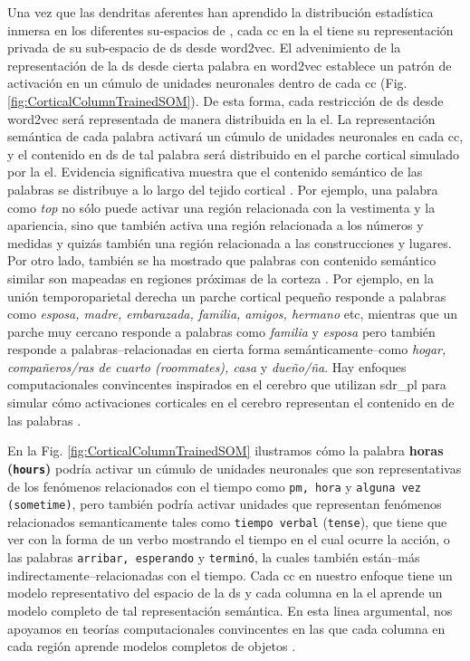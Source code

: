 {Una vez que las dendritas aferentes han aprendido la distribución estadística inmersa en los diferentes su-espacios de , cada \gls{cc} en la \gls{el} tiene su representación privada de su sub-espacio de \gls{ds} desde word2vec.
El advenimiento de la representación de la \gls{ds} desde cierta palabra en word2vec establece un patrón de activación en un cúmulo de unidades neuronales dentro de cada \gls{cc} (Fig. \ref{fig:CorticalColumnTrainedSOM}).
De esta forma, cada restricción de \gls{ds} desde word2vec será representada de manera distribuida en la \gls{el}.
La representación semántica de cada palabra activará un cúmulo de unidades neuronales en cada \gls{cc}, y el contenido en \gls{ds} de tal palabra será distribuido en el parche cortical simulado por la \gls{el}.
Evidencia significativa muestra que el contenido semántico de las palabras se distribuye a lo largo del tejido cortical \cite{huth_natural_2016}.
Por ejemplo, una palabra como \emph{top} no sólo puede activar una región relacionada con la vestimenta y la apariencia, sino que también activa una región relacionada a los números y medidas y quizás también una región relacionada a las construcciones y lugares.
Por otro lado, también se ha mostrado que palabras con contenido semántico similar son mapeadas en regiones próximas de la corteza \cite{pub.1005704802}.
Por ejemplo, en la unión temporoparietal derecha un parche cortical pequeño responde a palabras como \emph{esposa, madre, embarazada, familia, amigos, hermano} etc, mientras que un parche muy cercano responde a palabras como \emph{familia} y \emph{esposa} pero también responde a palabras--relacionadas en cierta forma semánticamente--como \emph{hogar, compañeros/ras de cuarto (roommates), casa} y \emph{dueño/ña}.
Hay enfoques computacionales convincentes inspirados en el cerebro que utilizan \gls{sdr_pl} para simular cómo activaciones corticales en el cerebro representan el contenido en  de las palabras \cite{DBLP:journals/corr/Webber15}.

En la Fig. \ref{fig:CorticalColumnTrainedSOM} ilustramos cómo la palabra \textbf{horas} \textbf{(\texttt{hours})} podría activar un cúmulo de unidades neuronales que son representativas de los fenómenos relacionados con el tiempo como \texttt{pm, hora} y \texttt{alguna vez (sometime)}, pero también podría activar unidades que representan fenómenos relacionados semanticamente tales como \texttt{tiempo verbal} (\texttt{tense}), que tiene que ver con la forma de un verbo mostrando el tiempo en el cual ocurre la acción, o las palabras \texttt{arribar, esperando} y \texttt{terminó}, la cuales también están--más indirectamente--relacionadas con el tiempo.
Cada \gls{cc} en nuestro enfoque tiene un modelo representativo del espacio de la \gls{ds} y cada columna en la \gls{el} aprende un modelo completo de tal representación semántica.
En esta linea argumental, nos apoyamos en teorías computacionales convincentes en las que cada columna en cada región aprende modelos completos de objetos \cite{10.3389/fncir.2018.00121}.

}
